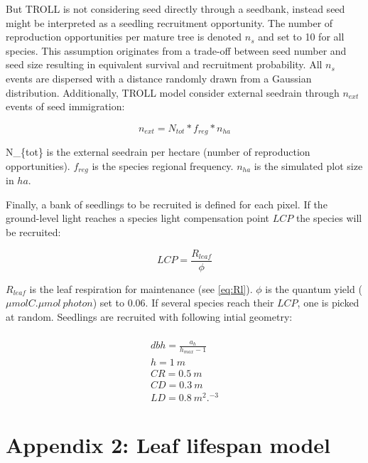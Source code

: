 \documentclass[12pt,]{article}
\let\oldsection\section
\renewcommand\section{\newpage\oldsection}
\theoremstyle{definition}
\theoremstyle{definition}
\theoremstyle{remark}
\begin{document}
But TROLL is not considering seed directly through a seedbank, instead
seed might be interpreted as a seedling recruitment opportunity. The
number of reproduction opportunities per mature tree is denoted \(n_s\)
and set to 10 for all species. This assumption originates from a
trade-off between seed number and seed size resulting in equivalent
survival and recruitment probability. All \(n_s\) events are dispersed
with a distance randomly drawn from a Gaussian distribution.
Additionally, TROLL model consider external seedrain through \(n_{ext}\)
events of seed immigration:

\begin{equation}
  n_{ext} = N_{tot}*f_{reg}*n_{ha}
  \label{eq:next}
\end{equation}

N\_\{tot\} is the external seedrain per hectare (number of reproduction
opportunities). \(f_{reg}\) is the species regional frequency.
\(n_{ha}\) is the simulated plot size in \(ha\).

Finally, a bank of seedlings to be recruited is defined for each pixel.
If the ground-level light reaches a species light compensation point
\(LCP\) the species will be recruited:

\begin{equation}
  LCP = \frac{R_{leaf}}{\phi}
  \label{eq:LCP}
\end{equation}

\(R_{leaf}\) is the leaf respiration for maintenance (see \eqref{eq:Rl}).
\(\phi\) is the quantum yield (\(\mu mol C.\mu mol~photon\)) set to
0.06. If several species reach their \(LCP\), one is picked at random.
Seedlings are recruited with following intial geometry:

\begin{equation}
  \begin{array}{c} \\
    dbh = \frac{a_h}{h_{max} - 1}\\
    h = 1~m\\
    CR = 0.5~m\\
    CD = 0.3~m\\
    LD = 0.8~m^2.^{-3}
  \end{array}
  \label{eq:C}
\end{equation}

\hypertarget{appendix-2-leaf-lifespan-model}{\section{Appendix 2: Leaf
lifespan model}\label{appendix-2-leaf-lifespan-model}}
\end{document}
